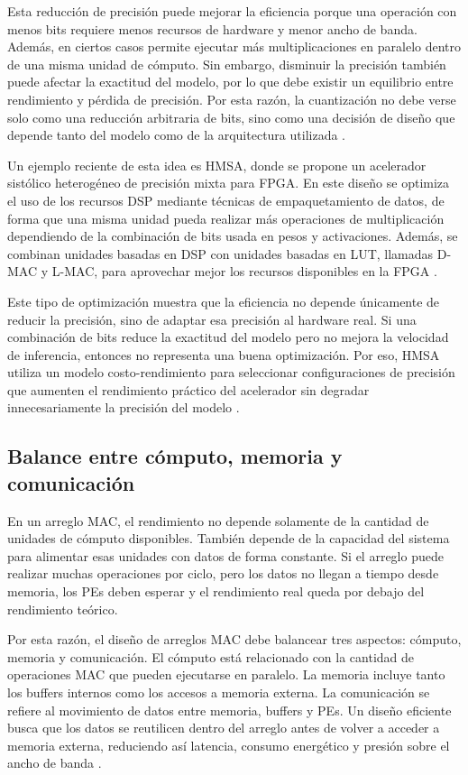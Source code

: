 \documentclass[conference]{IEEEtran}
\begin{document}
Esta reducción de precisión puede mejorar la eficiencia porque una operación con menos bits requiere menos recursos de hardware y menor ancho de banda. Además, en ciertos casos permite ejecutar más multiplicaciones en paralelo dentro de una misma unidad de cómputo. Sin embargo, disminuir la precisión también puede afectar la exactitud del modelo, por lo que debe existir un equilibrio entre rendimiento y pérdida de precisión. Por esta razón, la cuantización no debe verse solo como una reducción arbitraria de bits, sino como una decisión de diseño que depende tanto del modelo como de la arquitectura utilizada \cite{xu2023survey}.

Un ejemplo reciente de esta idea es HMSA, donde se propone un acelerador sistólico heterogéneo de precisión mixta para FPGA. En este diseño se optimiza el uso de los recursos DSP mediante técnicas de empaquetamiento de datos, de forma que una misma unidad pueda realizar más operaciones de multiplicación dependiendo de la combinación de bits usada en pesos y activaciones. Además, se combinan unidades basadas en DSP con unidades basadas en LUT, llamadas D-MAC y L-MAC, para aprovechar mejor los recursos disponibles en la FPGA \cite{cao2025hmsa}.

Este tipo de optimización muestra que la eficiencia no depende únicamente de reducir la precisión, sino de adaptar esa precisión al hardware real. Si una combinación de bits reduce la exactitud del modelo pero no mejora la velocidad de inferencia, entonces no representa una buena optimización. Por eso, HMSA utiliza un modelo costo-rendimiento para seleccionar configuraciones de precisión que aumenten el rendimiento práctico del acelerador sin degradar innecesariamente la precisión del modelo \cite{cao2025hmsa}.

\subsection{Balance entre cómputo, memoria y comunicación}

En un arreglo MAC, el rendimiento no depende solamente de la cantidad de unidades de cómputo disponibles. También depende de la capacidad del sistema para alimentar esas unidades con datos de forma constante. Si el arreglo puede realizar muchas operaciones por ciclo, pero los datos no llegan a tiempo desde memoria, los PEs deben esperar y el rendimiento real queda por debajo del rendimiento teórico.

Por esta razón, el diseño de arreglos MAC debe balancear tres aspectos: cómputo, memoria y comunicación. El cómputo está relacionado con la cantidad de operaciones MAC que pueden ejecutarse en paralelo. La memoria incluye tanto los buffers internos como los accesos a memoria externa. La comunicación se refiere al movimiento de datos entre memoria, buffers y PEs. Un diseño eficiente busca que los datos se reutilicen dentro del arreglo antes de volver a acceder a memoria externa, reduciendo así latencia, consumo energético y presión sobre el ancho de banda \cite{xu2023survey}.
\end{document}
